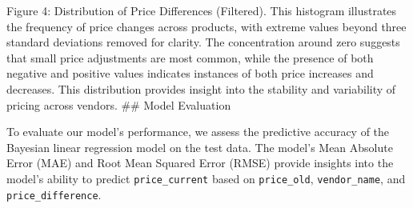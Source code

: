 \documentclass[
  letterpaper,
  DIV=11,
  numbers=noendperiod]{scrartcl}
\begin{document}
Figure 4: Distribution of Price Differences (Filtered). This histogram
illustrates the frequency of price changes across products, with extreme
values beyond three standard deviations removed for clarity. The
concentration around zero suggests that small price adjustments are most
common, while the presence of both negative and positive values
indicates instances of both price increases and decreases. This
distribution provides insight into the stability and variability of
pricing across vendors. \#\# Model Evaluation

To evaluate our model's performance, we assess the predictive accuracy
of the Bayesian linear regression model on the test data. The model's
Mean Absolute Error (MAE) and Root Mean Squared Error (RMSE) provide
insights into the model's ability to predict \texttt{price\_current}
based on \texttt{price\_old}, \texttt{vendor\_name}, and
\texttt{price\_difference}.
\end{document}
